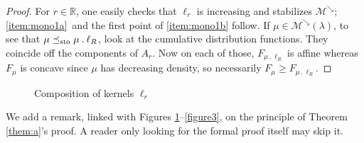 \documentclass[JEP,XML,SOM,Unicode,NoEqCountersInSection,NoFloatCountersInSection,published]{cedram}
\newcommand{\ldot}{\mathbin{.}}
\theoremstyle{plain}
\theoremstyle{definition}
\newcommand{\la}{\lambda}
\newcommand{\R}{\mathbb{R}}
\newcommand{\leqs}{\preceq_{\text{\rm sto}}}
\newcommand{\mdec}{\mathcal{M}^{\scriptscriptstyle\searrow}}
\begin{document}
\begin{proof} For $r\in \R$, one easily checks that $\ell_r$ is increasing and stabilizes $\mdec$; \eqref{item:mono1a}~and the first point of \eqref{item:mono1b} follow. If $\mu\in \mdec(\la)$, to see that $\mu\leqs \mu\ldot\ell_R$, look at the cumulative distribution functions. They coincide off the components of $A_r$. Now on each of those, $F_{\mu\ldot\ell_R}$ is affine whereas $F_\mu$ is concave since $\mu$ has decreasing density, so necessarily $F_\mu\geqslant F_{\mu\ldot\ell_R}$.
\end{proof}

\begin{figure}
\begin{center}
\def\svgwidth{{.7\columnwidth}}

\caption{Composition of kernels $\ell_r$}\label{figure}
\end{center}
\end{figure}

We add a remark, linked with Figures \ref{figure}--\ref{figure3}, on the principle of Theorem \ref{them:a}'s proof. A reader only looking for the formal proof itself may skip it.
\end{document}
